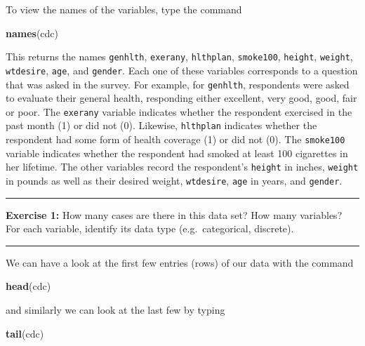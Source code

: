 \documentclass[]{book}
\newenvironment{Shaded}{\begin{snugshade}}{\end{snugshade}}
\newcommand{\KeywordTok}[1]{\textcolor[rgb]{0.13,0.29,0.53}{\textbf{#1}}}
\newcommand{\NormalTok}[1]{#1}
\theoremstyle{definition}
\theoremstyle{definition}
\theoremstyle{definition}
\theoremstyle{remark}
\begin{document}
To view the names of the variables, type the command

\begin{Shaded}
\begin{Highlighting}[]
\KeywordTok{names}\NormalTok{(cdc)}
\end{Highlighting}
\end{Shaded}

This returns the names \texttt{genhlth}, \texttt{exerany},
\texttt{hlthplan}, \texttt{smoke100}, \texttt{height}, \texttt{weight},
\texttt{wtdesire}, \texttt{age}, and \texttt{gender}. Each one of these
variables corresponds to a question that was asked in the survey. For
example, for \texttt{genhlth}, respondents were asked to evaluate their
general health, responding either excellent, very good, good, fair or
poor. The \texttt{exerany} variable indicates whether the respondent
exercised in the past month (1) or did not (0). Likewise,
\texttt{hlthplan} indicates whether the respondent had some form of
health coverage (1) or did not (0). The \texttt{smoke100} variable
indicates whether the respondent had smoked at least 100 cigarettes in
her lifetime. The other variables record the respondent's
\texttt{height} in inches, \texttt{weight} in pounds as well as their
desired weight, \texttt{wtdesire}, \texttt{age} in years, and
\texttt{gender}.

\begin{center}\rule{0.5\linewidth}{\linethickness}\end{center}

\textbf{Exercise 1:} How many cases are there in this data set? How many
variables? For each variable, identify its data type (e.g.~categorical,
discrete).

\begin{center}\rule{0.5\linewidth}{\linethickness}\end{center}

We can have a look at the first few entries (rows) of our data with the
command

\begin{Shaded}
\begin{Highlighting}[]
\KeywordTok{head}\NormalTok{(cdc)}
\end{Highlighting}
\end{Shaded}

and similarly we can look at the last few by typing

\begin{Shaded}
\begin{Highlighting}[]
\KeywordTok{tail}\NormalTok{(cdc)}
\end{Highlighting}
\end{Shaded}
\end{document}
